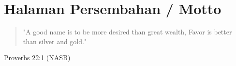 \chapter*{Halaman Persembahan / Motto}

\vspace{2cm}
\begin{quote}
    
"A good name is to be more desired than great wealth,
Favor is better than silver and gold."

\end{quote}

\hfill Proverbs 22:1 (NASB)